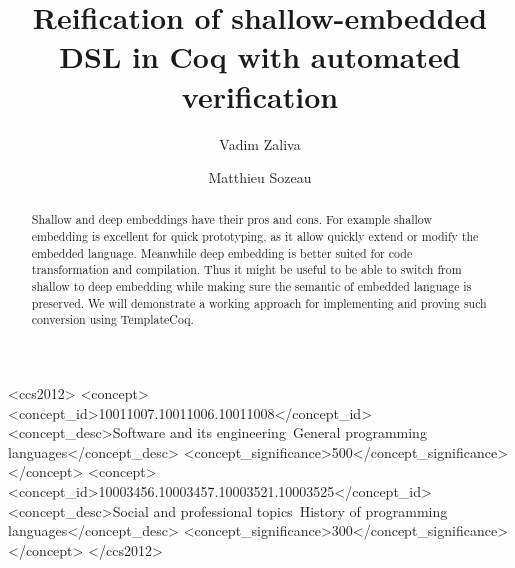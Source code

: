 \documentclass[sigplan]{acmart}\settopmatter{printfolios=true,printccs=false,printacmref=false}
\begin{document}
\title{Reification of shallow-embedded DSL in Coq with automated verification}         %


\author{Vadim Zaliva}

\author{Matthieu Sozeau}


\begin{abstract}
  Shallow and deep embeddings have their pros and cons. For example
  shallow embedding is excellent for quick prototyping, as it allow
  quickly extend or modify the embedded language.  Meanwhile deep
  embedding is better suited for code transformation and compilation.
  Thus it might be useful to be able to switch from shallow to deep
  embedding while making sure the semantic of embedded language is
  preserved. We will demonstrate a working approach for implementing
  and proving such conversion using TemplateCoq.
\end{abstract}


\begin{CCSXML}
<ccs2012>
<concept>
<concept_id>10011007.10011006.10011008</concept_id>
<concept_desc>Software and its engineering~General programming languages</concept_desc>
<concept_significance>500</concept_significance>
</concept>
<concept>
<concept_id>10003456.10003457.10003521.10003525</concept_id>
<concept_desc>Social and professional topics~History of programming languages</concept_desc>
<concept_significance>300</concept_significance>
</concept>
</ccs2012>
\end{CCSXML}

\end{document}
